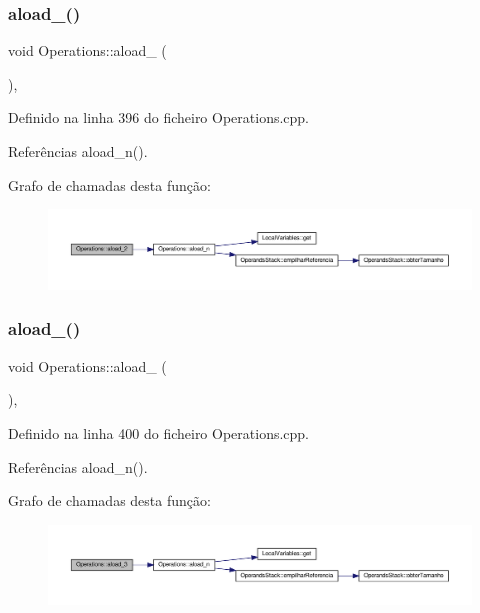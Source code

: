 \subsubsection{\texorpdfstring{aload\+\_()}{aload\_2()}}
{\footnotesize\ttfamily void Operations\+::aload\+\_ (\begin{DoxyParamCaption}{ }\end{DoxyParamCaption})\hspace{0.3cm}{\ttfamily [static]}, {\ttfamily [private]}}



Definido na linha 396 do ficheiro Operations.\+cpp.



Referências aload\+\_\+n().

Grafo de chamadas desta função\+:
\nopagebreak
\begin{figure}[H]
\begin{center}
\leavevmode
\includegraphics[width=350pt]{classOperations_abd58f463152d7f88b9fb2f133c6ca184_cgraph}
\end{center}
\end{figure}
\mbox{\label{classOperations_ac0cadd4fe7c17eab1985f11b5389fafc}} 
\subsubsection{\texorpdfstring{aload\+\_()}{aload\_3()}}
{\footnotesize\ttfamily void Operations\+::aload\+\_ (\begin{DoxyParamCaption}{ }\end{DoxyParamCaption})\hspace{0.3cm}{\ttfamily [static]}, {\ttfamily [private]}}



Definido na linha 400 do ficheiro Operations.\+cpp.



Referências aload\+\_\+n().

Grafo de chamadas desta função\+:
\nopagebreak
\begin{figure}[H]
\begin{center}
\leavevmode
\includegraphics[width=350pt]{classOperations_ac0cadd4fe7c17eab1985f11b5389fafc_cgraph}
\end{center}
\end{figure}
\mbox{\label{classOperations_ad148cdfeb25166f5c097cee60ea36325}} 
